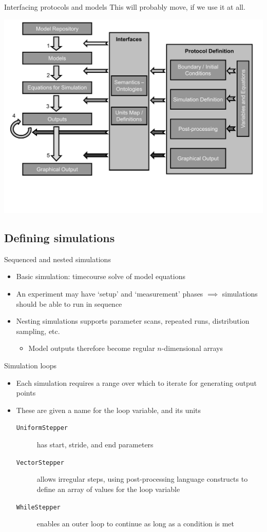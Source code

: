 \documentclass[t,xcolor={usenames,dvipsnames}]{beamer}
\newcommand{\subitem}[1]{\begin{itemize}[<.->]\item #1 \end{itemize}}
\begin{document}
\begin{frame}{Interfacing protocols and models}
This will probably move, if we use it at all.
\begin{center}
\includegraphics[width=.9\textwidth]{schematic_v4}
\end{center}
\end{frame}

\subsection{Defining simulations}

\begin{frame}{Sequenced and nested simulations}
\begin{itemize}[<+->]
\item Basic simulation: timecourse solve of model equations
\item An experiment may have `setup' and `measurement' phases $\implies$ simulations should be able to run in sequence
\item \alert{Nesting} simulations supports parameter scans, repeated runs, distribution sampling, etc.
  \subitem{\alert{Model outputs therefore become regular $n$-dimensional arrays}}
\end{itemize}
\end{frame}

\begin{frame}{Simulation loops}
\begin{itemize}
\item Each simulation requires a \alert{range} over which to iterate for generating output points
\item These are given a name for the loop variable, and its units
  \begin{description}
  \item[\texttt{UniformStepper}] has start, stride, and end parameters
  \item[\texttt{VectorStepper}] allows irregular steps, using post-processing language constructs to define an array of values for the loop variable
  \item[\texttt{WhileStepper}] enables an outer loop to continue as long as a condition is met
  \end{description}
\end{itemize}
\end{frame}
\end{document}
